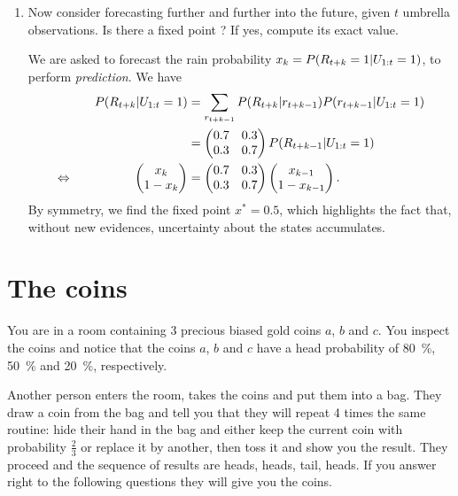 \documentclass[11pt, a4paper]{article}
\begin{document}
\begin{enumerate}
    \item Now consider forecasting further and further into the future, given $t$ umbrella observations. Is there a fixed point ? If yes, compute its exact value.

    \begin{solution}
        We are asked to forecast the rain probability $x_k = P(R_{t + k} = 1 \vert U_{1:t} = 1)$, \ie{} to perform \emph{prediction}. We have
        \begin{alignat*}{2}
            && P(R_{t+k} \vert U_{1:t} = 1) & = \sum_{r_{t+k-1}} P(R_{t+k} \vert r_{t+k-1}) P(r_{t+k-1} \vert U_{1:t} = 1) \\
            &&& = \begin{pmatrix}0.7 & 0.3 \\ 0.3 & 0.7\end{pmatrix} P(R_{t+k-1} \vert U_{1:t} = 1) \\
            \Leftrightarrow \quad && \begin{pmatrix}x_k \\ 1 - x_k\end{pmatrix} & = \begin{pmatrix}0.7 & 0.3 \\ 0.3 & 0.7\end{pmatrix} \begin{pmatrix}x_{k - 1} \\ 1 - x_{k - 1}\end{pmatrix} .
        \end{alignat*}
        By symmetry, we find the fixed point $x^* = 0.5$, which highlights the fact that, without new evidences, uncertainty about the states accumulates.
    \end{solution}
\end{enumerate}

\newpage

\section{The coins}

You are in a room containing 3 precious biased gold coins $a$, $b$ and $c$. You inspect the coins and notice that the coins $a$, $b$ and $c$ have a head probability of \qty{80}{\percent}, \qty{50}{\percent} and \qty{20}{\percent}, respectively.

Another person enters the room, takes the coins and put them into a bag. They draw a coin from the bag and tell you that they will repeat 4 times the same routine: hide their hand in the bag and either keep the current coin with probability $\frac{2}{3}$ or replace it by another, then toss it and show you the result. They proceed and the sequence of results are heads, heads, tail, heads. If you answer right to the following questions they will give you the coins.
\end{document}
